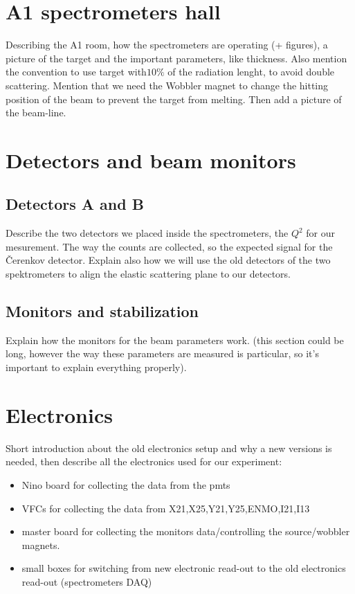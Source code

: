 \section{A1 spectrometers hall}

Describing the A1 room, how the spectrometers are operating (+ figures), a picture of the target and the important parameters, like thickness. Also mention the convention to use target with$10 \%$ of the radiation lenght, to avoid double scattering.  Mention that we need the Wobbler magnet to change the hitting position of the beam to prevent the target from melting.
Then add a picture of the beam-line.

\section{Detectors and beam monitors}

\subsection{Detectors A and B}
Describe the two detectors we placed inside the spectrometers, the $Q^{2}$ for our mesurement. The way the counts are collected, so the expected signal for the Čerenkov detector. Explain also how we will use the old detectors of the two spektrometers to align the elastic scattering plane to our detectors.

\subsection{Monitors and stabilization}
Explain how the monitors for the beam parameters work. (this section could be long, however the way these parameters are measured is particular, so it's important to explain everything properly).

\section{Electronics}
Short introduction about the old electronics setup and why a new versions is needed, then describe all the electronics used for our experiment:
\begin{itemize}
\item Nino board for collecting the data from the pmts
\item VFCs for collecting the data from X21,X25,Y21,Y25,ENMO,I21,I13
\item master board for collecting the monitors data/controlling the source/wobbler magnets.
\item small boxes for switching from new electronic read-out to the old electronics read-out (spectrometers DAQ)
\end{itemize}

